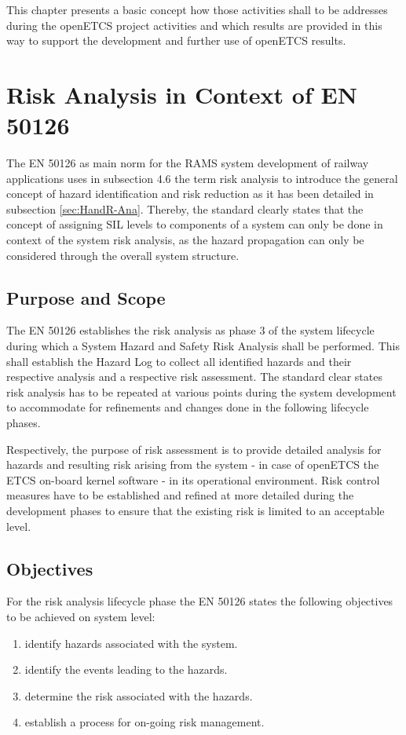 \documentclass{template/openetcs_report}
\begin{document}
This chapter presents a basic concept how those activities shall to be addresses during the openETCS project activities and which results are provided in this way to support the development and further use of openETCS results. 

\section{Risk Analysis in Context of EN 50126}
\label{sec:EN50126-risk-analysis}
The EN 50126 as main norm for the RAMS system development of railway applications uses in subsection 4.6 the term risk analysis to introduce the general concept of hazard identification and risk reduction as it has been detailed in subsection \ref{sec:HandR-Ana}. Thereby, the standard clearly states that the concept of assigning SIL levels to components of a system can only be done in context of the system risk analysis, as the hazard propagation can only be considered through the overall system structure. 

\subsection{Purpose and Scope}

The EN 50126 establishes the risk analysis as phase 3 of the system lifecycle during which a System Hazard and Safety Risk Analysis shall be performed. This shall establish the Hazard Log to collect all identified hazards and their respective analysis and a respective risk assessment. The standard clear states risk analysis has to be repeated at various points during the system development to accommodate for refinements and changes done in the following lifecycle phases. 

Respectively, the purpose of risk assessment is to provide detailed analysis for hazards and resulting risk arising from the system - in case of openETCS the ETCS on-board kernel software -  in its operational environment. Risk control measures have to be established and refined at more detailed during the development phases to ensure that the existing risk is limited to an acceptable level. 

\subsection{Objectives}

For the risk analysis lifecycle phase the EN 50126 states the following objectives to be achieved on system level:
\begin{enumerate}
\item identify hazards associated with the system.
\item identify the events leading to the hazards.
\item determine the risk associated with the hazards.
\item establish a process for on-going risk management.
\end{enumerate}
\end{document}
